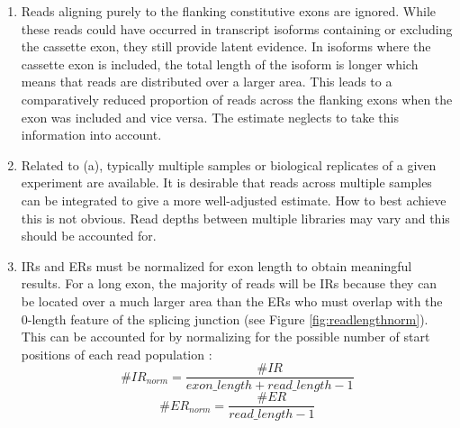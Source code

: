 \begin{enumerate}[label=(\alph*)]
	
	\item Reads aligning purely to the flanking constitutive exons are ignored. While these reads could have occurred in transcript isoforms containing or excluding the cassette exon, they still provide latent evidence. %
	In isoforms where the cassette exon is included, the total length of the isoform is longer which means that reads are distributed over a larger area. This leads to a comparatively reduced proportion of reads across the flanking exons when the exon was included and vice versa. The estimate neglects to take this information into account.
	\item Related to (a), typically multiple samples or biological replicates of a given experiment are available. It is desirable that reads across multiple samples can be integrated to give a more well-adjusted estimate. How to best achieve this is not obvious. Read depths between multiple libraries may vary and this should be accounted for. 
	\item IRs and ERs must be normalized for exon length to obtain meaningful results. For a long exon, the majority of reads will be IRs because they can be located over a much larger area than the ERs who must overlap with the 0-length feature of the splicing junction (see Figure \ref{fig:readlengthnorm}). This can be accounted for by normalizing for the possible number of start positions of each read population \cite{berlinpsi}:
	$$\#IR_{norm} = \frac{\#IR}{exon\_length + read\_length -1}$$
	$$\#ER_{norm} = \frac{\#ER}{read\_length - 1}$$
	
	

\end{enumerate}
